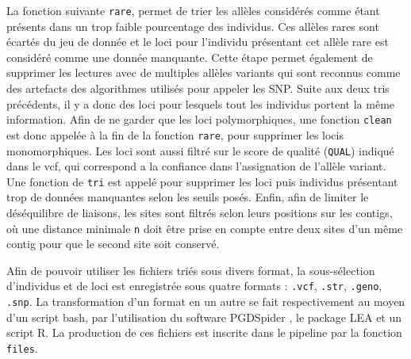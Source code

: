La fonction suivante \verb|rare|, permet de trier les allèles considérés comme étant présents dans un trop faible pourcentage des individus. 
Ces allèles rares sont écartés du jeu de donnée et le loci pour l'individu présentant cet allèle rare est considéré comme une donnée manquante. 
Cette étape permet également de supprimer les lectures avec de multiples allèles variants qui sont reconnus comme des artefacts des algorithmes utilisés pour appeler les SNP.  
Suite aux deux tris précédents, il y a donc des loci pour lesquels tout les individus portent la même information. 
Afin de ne garder que les loci polymorphiques, une fonction \verb|clean| est donc appelée à la fin de la fonction \verb|rare|, pour supprimer les locis monomorphiques.
Les loci sont aussi filtré sur le score de qualité (\verb|QUAL|) indiqué dans le vcf, qui correspond a la confiance dans l'assignation de l'allèle variant. 
Une fonction de \verb|tri| est appelé pour supprimer les loci puis individus présentant trop de données manquantes selon les seuils posés.
Enfin, afin de limiter le déséquilibre de liaisons, les sites sont filtrés selon leurs positions sur les contigs, où une distance minimale \verb|n| doit être prise en compte entre deux sites d'un même contig pour que le second site soit conservé.


Afin de pouvoir utiliser les fichiers triés sous divers format, la sous-sélection d'individus et de loci est enregistrée sous quatre formats : \verb|.vcf|, \verb|.str|, \verb|.geno|, \verb|.snp|. 
La transformation d'un format en un autre se fait respectivement au moyen d'un script bash, par l'utilisation du software PGDSpider \citep{Lischer2012}, le package LEA \citep{Frichot2015} et un script R. 
La production de ces fichiers est inscrite dans le pipeline par la fonction \verb|files|.

